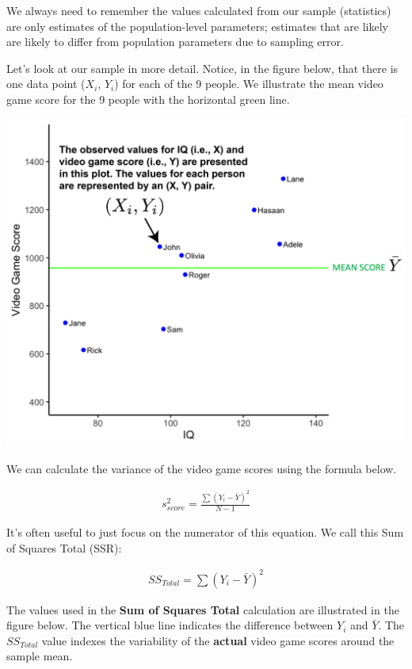 \documentclass[
]{krantz}
\begin{document}
We always need to remember the values calculated from our sample (statistics) are only estimates of the population-level parameters; estimates that are likely are likely to differ from population parameters due to sampling error.

Let's look at our sample in more detail. Notice, in the figure below, that there is one data point (\(X_i\), \(Y_i\)) for each of the 9 people. We illustrate the mean video game score for the 9 people with the horizontal green line.

\includegraphics[width=0.8\linewidth]{ch_correlation/images/sample_plot1}

We can calculate the variance of the video game scores using the formula below.

\[
\begin{aligned}
s^2_{score} = \frac{\sum{(Y_i - \bar{Y})^2}}{N-1}
\end{aligned}
\]

It's often useful to just focus on the numerator of this equation. We call this Sum of Squares Total (SSR):

\[
\begin{aligned}
SS_{Total} = \sum{(Y_i - \bar{Y})^2}
\end{aligned}
\]

The values used in the \textbf{Sum of Squares Total} calculation are illustrated in the figure below. The vertical blue line indicates the difference between \(Y_i\) and \(\bar{Y}\). The \(SS_{Total}\) value indexes the variability of the \textbf{actual} video game scores around the sample mean.
\end{document}
